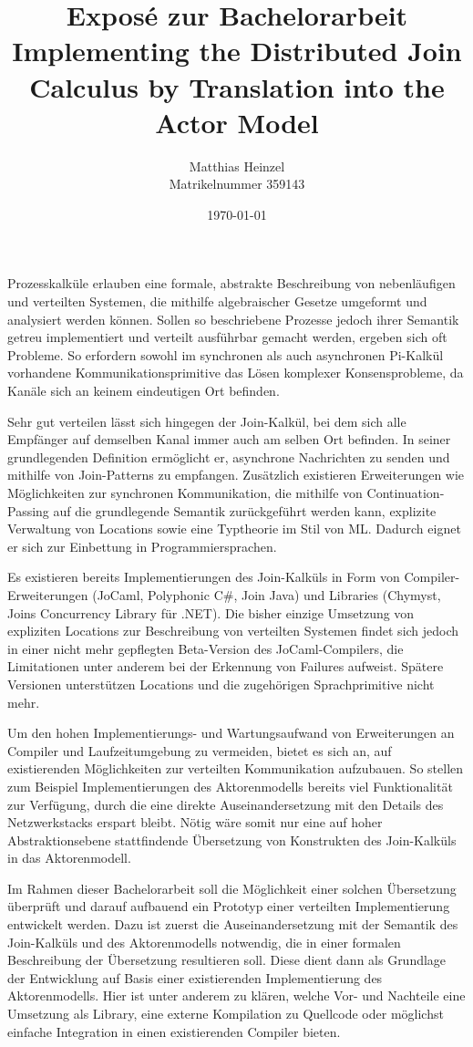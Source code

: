 \documentclass[12pt]{article}
\title{{\large Expos\'e zur Bachelorarbeit}
\\ Implementing the Distributed Join Calculus by Translation into the Actor Model
%
}
\author{Matthias Heinzel\\Matrikelnummer 359143}
\date{\today}
\begin{document}
\maketitle

Prozesskalküle erlauben eine formale, abstrakte Beschreibung von nebenläufigen und verteilten Systemen, die mithilfe algebraischer Gesetze umgeformt und analysiert werden können.
Sollen so beschriebene Prozesse jedoch ihrer Semantik getreu implementiert und verteilt ausführbar gemacht werden, ergeben sich oft Probleme.
So erfordern sowohl im synchronen als auch asynchronen Pi-Kalkül vorhandene Kommunikationsprimitive das Lösen komplexer Konsensprobleme, da Kanäle sich an keinem eindeutigen Ort befinden.

Sehr gut verteilen lässt sich hingegen der Join-Kalkül, bei dem sich alle Empfänger auf demselben Kanal immer auch am selben Ort befinden.
In seiner grundlegenden Definition ermöglicht er, asynchrone Nachrichten zu senden und mithilfe von Join-Patterns zu empfangen.
Zusätzlich existieren Erweiterungen wie Möglichkeiten zur synchronen Kommunikation, die mithilfe von Continuation-Passing auf die grundlegende Semantik zurückgeführt werden kann, explizite Verwaltung von Locations sowie eine Typtheorie im Stil von ML. Dadurch eignet er sich zur Einbettung in Programmiersprachen.

Es existieren bereits Implementierungen des Join-Kalküls in Form von Compiler-Erweiterungen (JoCaml, Polyphonic C\#, Join Java) und Libraries (Chymyst, Joins Concurrency Library für .NET).
Die bisher einzige Umsetzung von expliziten Locations zur Beschreibung von verteilten Systemen findet sich jedoch in einer nicht mehr gepflegten Beta-Version des JoCaml-Compilers, die Limitationen unter anderem bei der Erkennung von Failures aufweist.
Spätere Versionen unterstützen Locations und die zugehörigen Sprachprimitive nicht mehr.

Um den hohen Implementierungs- und Wartungsaufwand von Erweiterungen an Compiler und Laufzeitumgebung zu vermeiden, bietet es sich an, auf existierenden Möglichkeiten zur verteilten Kommunikation aufzubauen.
So stellen zum Beispiel Implementierungen des Aktorenmodells bereits viel Funktionalität zur Verfügung, durch die eine direkte Auseinandersetzung mit den Details des Netzwerkstacks erspart bleibt.
Nötig wäre somit nur eine auf hoher Abstraktionsebene stattfindende Übersetzung von Konstrukten des Join-Kalküls in das Aktorenmodell.

Im Rahmen dieser Bachelorarbeit soll die Möglichkeit einer solchen Übersetzung überprüft und darauf aufbauend ein Prototyp einer verteilten Implementierung entwickelt werden.
Dazu ist zuerst die Auseinandersetzung mit der Semantik des Join-Kalküls und des Aktorenmodells notwendig, die in einer formalen Beschreibung der Übersetzung resultieren soll.
Diese dient dann als Grundlage der Entwicklung auf Basis einer existierenden Implementierung des Aktorenmodells.
Hier ist unter anderem zu klären, welche Vor- und Nachteile eine Umsetzung als Library, eine externe Kompilation zu Quellcode oder möglichst einfache Integration in einen existierenden Compiler bieten.
\end{document}
